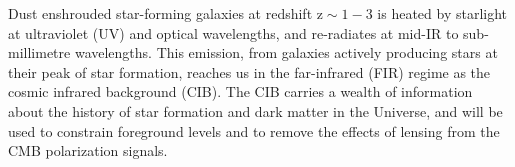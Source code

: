 Dust enshrouded star-forming galaxies at redshift $\mathrm{z\sim 1-3}$ is heated by starlight at ultraviolet (UV) and optical wavelengths,
and re-radiates at mid-IR to sub-millimetre wavelengths. This emission, from galaxies actively
producing stars at their peak of star formation, reaches us in the far-infrared (FIR) regime as the cosmic infrared
background (CIB). The CIB carries a wealth of information about the history of star formation and dark matter 
in the Universe, and will be used to constrain foreground levels and to remove the effects of lensing 
from the CMB polarization signals. 



